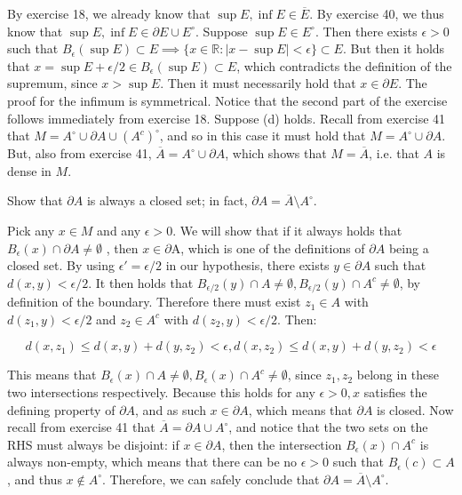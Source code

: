 \begin{solution}
    
    By exercise 18, we already know that $\sup E, \inf E \in \overline{E}$.
    By exercise 40, we thus know that $\sup E, \inf E \in \partial E \cup E^\circ$.
    Suppose $\sup E \in E^\circ$.
    Then there exists $\epsilon > 0$ such that $B_{\epsilon}(\sup E) \subset E \implies \{x \in \mathbb{R}: \lvert x - \sup E \rvert < \epsilon\} \subset E$.
    But then it holds that $x = \sup E + \epsilon/2 \in B_{\epsilon}(\sup E) \subset E$, which contradicts the definition of the supremum, since $x > \sup E$.
    Then it must necessarily hold that $x \in \partial E$.
    The proof for the infimum is symmetrical.
    Notice that the second part of the exercise follows immediately from exercise 18.
    Suppose (d) holds.
    Recall from exercise 41 that $M = A^\circ \cup \partial A \cup (A^c)^\circ$, and so in this case it must hold that $M = A^\circ \cup \partial A$.
    But, also from exercise 41, $\overline{A} = A^\circ \cup \partial A$, which shows that $M = \overline{A}$, i.e. that $A$ is dense in $M$.
\end{solution}

\begin{exercise}{43}
    Show that $\partial A$ is always a closed set; in fact, $\partial A = \overline{A} \setminus A^\circ$.
\end{exercise}

\begin{solution}

    Pick any $x \in M$ and any $\epsilon > 0$.
    We will show that if it always holds that $B_{\epsilon}(x) \cap \partial A \neq \emptyset$ , then $x \in \partial $A, which is one of the definitions of $\partial A$ being a closed set.
    By using $\epsilon' = \epsilon/2$ in our hypothesis, there exists $y \in \partial A$ such that $d(x, y) < \epsilon/2$.
    It then holds that $B_{\epsilon/2}(y) \cap A \neq \emptyset, B_{\epsilon/2}(y) \cap A^c \neq \emptyset$, by definition of the boundary.
    Therefore there must exist $z_1 \in A$ with $d(z_1, y) < \epsilon/2$ and $z_2 \in A^c$ with $d(z_2, y) < \epsilon/2$.
    Then:

    $$d(x, z_1) \leq d(x, y) + d(y, z_2) < \epsilon, d(x, z_2) \leq d(x, y) + d(y, z_2) < \epsilon$$

    This means that $B_{\epsilon}(x) \cap A \neq \emptyset, B_{\epsilon}(x) \cap A^c \neq \emptyset$, since $z_1, z_2$ belong in these two intersections respectively.
    Because this holds for any $\epsilon > 0, x$ satisfies the defining property of $\partial A$, and as such $x \in \partial A$, which means that $\partial A$ is closed.
    Now recall from exercise 41 that $\overline{A} = \partial A \cup A^\circ$, and notice that the two sets on the RHS must always be disjoint: if $x \in \partial A$, then the intersection $B_{\epsilon}(x) \cap A^c$ is always non-empty, which means that there can be no $\epsilon > 0$ such that $B_{\epsilon}(c) \subset A$, and thus $x \notin A^\circ$.
    Therefore, we can safely conclude that $\partial A = \overline{A} \setminus A^\circ$.
\end{solution}

